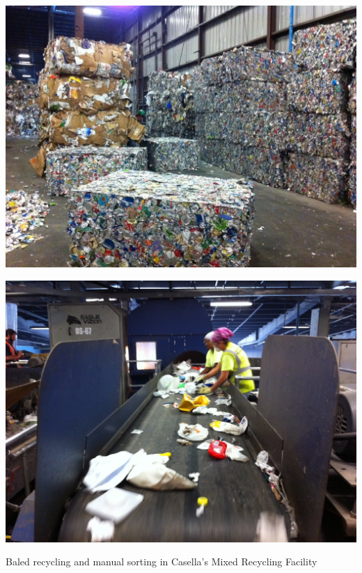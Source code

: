 \documentclass[nofonts,nols,justified,nobib]{tufte-book}
\begin{document}
\begin{marginfigure}
\includegraphics[width=\textwidth]{img/1/casella-bales.jpg}

\vspace{1cm}

\includegraphics[width=\textwidth]{img/1/casella-sorting.jpg}
\caption{Baled recycling and manual sorting in Casella's Mixed Recycling Facility \cite{delichatsios_trash_2011}}
\end{marginfigure}
\end{document}
